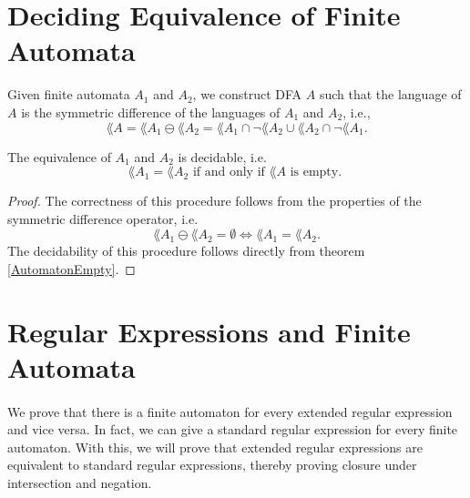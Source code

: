             \section{Deciding Equivalence of Finite Automata}
            Given finite automata $A_1$ and $A_2$, we construct DFA $A$ such that the language of $A$ is the symmetric difference of the languages of $A_1$ and $A_2$, i.e.,
            \begin{equation*}          \lang{A} = \lang{A_1} \ominus \lang{A_2} = \lang{A_1} \cap \neg \lang{A_2} \cup \lang{A_2} \cap \neg \lang{A_1}.      \end{equation*}
                \begin{theorem} The equivalence of $A_1$ and $A_2$ is decidable, i.e.
                    \begin{equation*}                \lang{A_1} = \lang{A_2} \mbox{ if and only if } \lang{A} \mbox{ is empty. }                \end{equation*}
                    \end{theorem}
                    \begin{proof}
                        The correctness of this procedure follows from the properties of the symmetric difference operator, i.e.
                        \begin{equation*}                  \lang{A_1} \ominus \lang{A_2} = \emptyset \Leftrightarrow \lang{A_1} = \lang{A_2}.                  \end{equation*}
                            The decidability of this procedure follows directly from theorem \ref{AutomatonEmpty}.
                        \end{proof}


                        \section{Regular Expressions and Finite Automata}

                        \paragraph{} 
                        We prove that there is a finite automaton for every extended regular expression and vice versa. 
                        In fact, we can give a standard regular expression for every finite automaton.
                        With this, we will prove that extended regular expressions are equivalent to standard regular expressions, 
                        thereby proving closure under intersection and negation.


